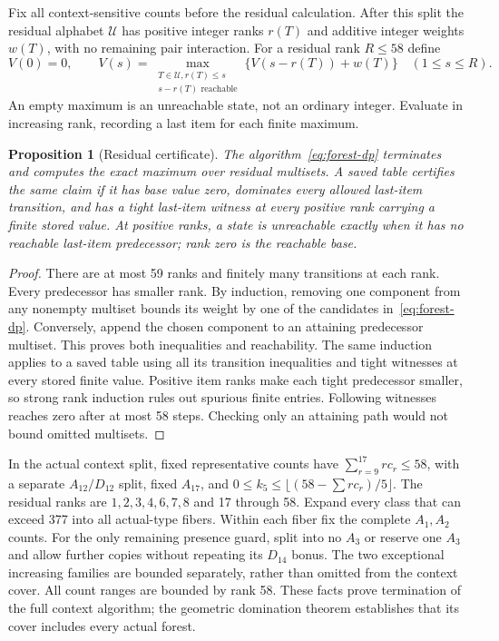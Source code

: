 \documentclass[11pt]{article}
\newtheorem{proposition}[theorem]{Proposition}
\theoremstyle{remark}\newtheorem{remark}[theorem]{Remark}
\begin{document}
Fix all context-sensitive counts before the residual calculation.
After this split the residual alphabet $\mathcal U$ has positive
integer ranks $r(T)$ and additive integer weights $w(T)$, with no
remaining pair interaction. For a residual rank $R\le58$ define
\begin{equation}\label{eq:forest-dp}
 V(0)=0,\qquad
 V(s)=\max_{\substack{T\in\mathcal U, r(T)\le s\\
                         s-r(T)\text{ reachable}}}
       \{V(s-r(T))+w(T)\}\quad(1\le s\le R).
\end{equation}
An empty maximum is an unreachable state, not an ordinary integer.
Evaluate in increasing rank, recording a last item for each finite
maximum.

\begin{proposition}[Residual certificate]\label{prop:dp-certificate}
The algorithm~\eqref{eq:forest-dp} terminates and computes the exact
maximum over residual multisets. A saved table certifies the same
claim if it has base value zero, dominates every allowed last-item
transition, and has a tight last-item witness at every positive rank
carrying a finite stored value. At positive ranks, a state is
unreachable exactly when it has no reachable last-item predecessor;
rank zero is the reachable base.
\end{proposition}
\begin{proof}
There are at most 59 ranks and finitely many transitions at each
rank. Every predecessor has smaller rank. By induction, removing
one component from any nonempty multiset bounds its weight by one
of the candidates in~\eqref{eq:forest-dp}. Conversely, append the
chosen component to an attaining predecessor multiset. This proves
both inequalities and reachability. The same induction applies to
a saved table using all its transition inequalities and tight
witnesses at every stored finite value. Positive item ranks make
each tight predecessor smaller, so strong rank induction rules out
spurious finite entries. Following witnesses reaches zero after at
most 58 steps.
Checking only an attaining path would not bound omitted multisets.
\end{proof}

In the actual context split, fixed representative counts have
$\sum_{r=9}^{17}rc_r\le58$, with a separate $A_{12}/D_{12}$
split, fixed $A_{17}$, and $0\le k_5\le
\lfloor(58-\sum rc_r)/5\rfloor$. The residual ranks are
$1,2,3,4,6,7,8$ and 17 through 58. Expand every class that can exceed
377 into all actual-type fibers. Within each fiber fix the complete
$A_1,A_2$ counts. For the only remaining presence guard, split into
no $A_3$ or reserve one $A_3$ and allow further copies without
repeating its $D_{14}$ bonus. The two exceptional increasing families
are bounded separately, rather than omitted from the context cover.
All count ranges are bounded by rank 58. These facts prove termination
of the full context algorithm; the geometric domination theorem
establishes that its cover includes every actual forest.
\end{document}
